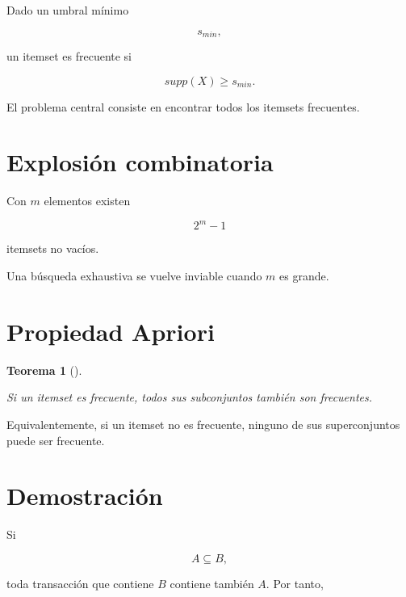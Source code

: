 \documentclass[
  spanish,
  10.5pt,
  letterpaper,
  DIV=11,
  numbers=noendperiod,
  oneside,
  open=any]{scrreprt}
\theoremstyle{definition}
\theoremstyle{definition}
\theoremstyle{plain}
\newtheorem{theorem}{Teorema}[chapter]
\theoremstyle{remark}
\begin{document}

Dado un umbral mínimo

\[
s_{min},
\]

un itemset es frecuente si

\[
supp(X)\geq s_{min}.
\]

El problema central consiste en encontrar todos los itemsets frecuentes.

\section*{Explosión combinatoria}\label{explosiuxf3n-combinatoria}


Con \(m\) elementos existen

\[
2^m-1
\]

itemsets no vacíos.

Una búsqueda exhaustiva se vuelve inviable cuando \(m\) es grande.

\section*{Propiedad Apriori}\label{propiedad-apriori}


\begin{theorem}[]\protect\hypertarget{thm-propiedad-apriori}{}\label{thm-propiedad-apriori}

Si un itemset es frecuente, todos sus subconjuntos también son
frecuentes.

\end{theorem}

Equivalentemente, si un itemset no es frecuente, ninguno de sus
superconjuntos puede ser frecuente.

\section*{Demostración}\label{demostraciuxf3n}


Si

\[
A\subseteq B,
\]

toda transacción que contiene \(B\) contiene también \(A\). Por tanto,
\end{document}
